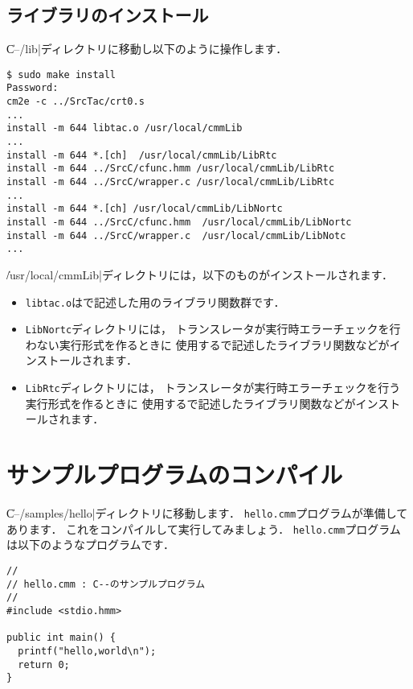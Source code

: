 \subsection{ライブラリのインストール}

\|C--/lib|ディレクトリに移動し以下のように操作します．

\begin{mylist}
\begin{verbatim}
$ sudo make install
Password:
cm2e -c ../SrcTac/crt0.s
...
install -m 644 libtac.o /usr/local/cmmLib
...
install -m 644 *.[ch]  /usr/local/cmmLib/LibRtc
install -m 644 ../SrcC/cfunc.hmm /usr/local/cmmLib/LibRtc
install -m 644 ../SrcC/wrapper.c /usr/local/cmmLib/LibRtc
...
install -m 644 *.[ch] /usr/local/cmmLib/LibNortc
install -m 644 ../SrcC/cfunc.hmm  /usr/local/cmmLib/LibNortc
install -m 644 ../SrcC/wrapper.c  /usr/local/cmmLib/LibNotc
...
\end{verbatim}
\end{mylist}

\|/usr/local/cmmLib|ディレクトリには，以下のものがインストールされます．

\begin{itemize}
\item {\tt libtac.o}は{\cmml}で記述した{\tacos}用のライブラリ関数群です．
\item {\tt LibNortc}ディレクトリには，
トランスレータが実行時エラーチェックを行わない実行形式を作るときに
使用する{\cl}で記述したライブラリ関数などがインストールされます．
\item {\tt LibRtc}ディレクトリには，
トランスレータが実行時エラーチェックを行う実行形式を作るときに
使用する{\cl}で記述したライブラリ関数などがインストールされます．
\end{itemize}

\section{サンプルプログラムのコンパイル}

\|C--/samples/hello|ディレクトリに移動します．
{\tt hello.cmm}プログラムが準備してあります．
これをコンパイルして実行してみましょう．
{\tt hello.cmm}プログラムは以下のような{\cmml}プログラムです．

\begin{mylist}
\begin{verbatim}
//
// hello.cmm : C--のサンプルプログラム
//
#include <stdio.hmm>

public int main() {
  printf("hello,world\n");
  return 0;
}
\end{verbatim}
\end{mylist}

